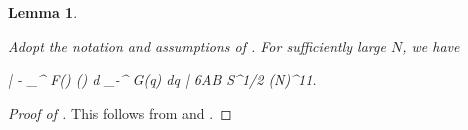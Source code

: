 \documentclass{amsart}
\numberwithin{equation}{section}
\newtheorem{lem}[thm]{Lemma}
\theoremstyle{remark}
\theoremstyle{definition}
\begin{document}
	\begin{lem}
		
		\label{expectationh} 
		
		Adopt the notation and assumptions of . For sufficiently large $N$, we have 
		\begin{flalign*}
			\Bigg|  \bigg[ \displaystyle\sum_{i=N_1}^{N_2} F(\Lambda_{i}) \cdot G ( q_i - q_j ) \bigg] - \displaystyle\int_{\infty}^{\infty} F(\lambda) \varrho(\lambda) d \lambda \displaystyle\int_{-\infty}^{\infty} G(\alpha q) dq \Bigg| \le 6AB S^{1/2} (\log N)^{11}.
		\end{flalign*}
	\end{lem} 
	
	
	\begin{proof}[Proof of ]
		
		This follows from  and . 
	\end{proof} 
	
	
	
\end{document}
